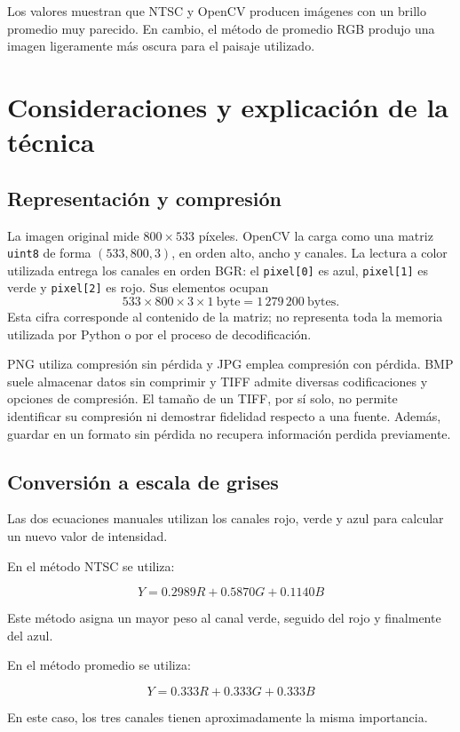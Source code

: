\documentclass[11pt,a4paper]{article}
\begin{document}
Los valores muestran que NTSC y OpenCV producen imágenes con un brillo
promedio muy parecido. En cambio, el método de promedio RGB produjo una
imagen ligeramente más oscura para el paisaje utilizado.

\section{Consideraciones y explicaci\'on de la t\'ecnica}
\subsection{Representaci\'on y compresi\'on}
La imagen original mide $800\times533$ p\'ixeles. OpenCV la carga como
una matriz \texttt{uint8} de forma $(533,800,3)$, en orden alto, ancho y
canales. La lectura a color utilizada entrega los canales en orden BGR:
el \mbox{\texttt{pixel[0]}} es azul, \texttt{pixel[1]} es verde y
\texttt{pixel[2]} es rojo. Sus elementos ocupan
\[
533\times800\times3\times1\ \text{byte}=1\,279\,200\ \text{bytes}.
\]
Esta cifra corresponde al contenido de la matriz; no representa toda la
memoria utilizada por Python o por el proceso de decodificaci\'on.

PNG utiliza compresi\'on sin p\'erdida y JPG emplea compresi\'on con
p\'erdida. BMP suele almacenar datos sin comprimir y TIFF admite diversas
codificaciones y opciones de compresi\'on. El tama\~no de un TIFF, por
s\'i solo, no permite identificar su compresi\'on ni demostrar fidelidad
respecto a una fuente. Adem\'as, guardar en un formato sin p\'erdida no
recupera informaci\'on perdida previamente.

\subsection{Conversión a escala de grises}

Las dos ecuaciones manuales utilizan los canales rojo, verde y azul para
calcular un nuevo valor de intensidad.

En el método NTSC se utiliza:

\[
Y = 0.2989R + 0.5870G + 0.1140B
\]

Este método asigna un mayor peso al canal verde, seguido del rojo y finalmente
del azul.

En el método promedio se utiliza:

\[
Y = 0.333R + 0.333G + 0.333B
\]

En este caso, los tres canales tienen aproximadamente la misma importancia.
\end{document}

